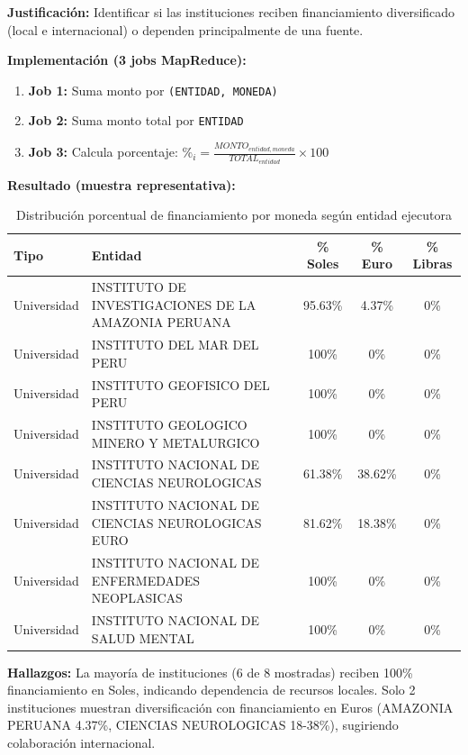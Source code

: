 \documentclass[12pt,a4paper]{article}
\begin{document}
\textbf{Justificación:} Identificar si las instituciones reciben financiamiento diversificado 
(local e internacional) o dependen principalmente de una fuente.

\textbf{Implementación (3 jobs MapReduce):}

\begin{enumerate}
    \item \textbf{Job 1:} Suma monto por \texttt{(ENTIDAD, MONEDA)}
    \item \textbf{Job 2:} Suma monto total por \texttt{ENTIDAD}
    \item \textbf{Job 3:} Calcula porcentaje: $\%_{i} = \frac{MONTO_{entidad,moneda}}{TOTAL_{entidad}} \times 100$
\end{enumerate}

\textbf{Resultado (muestra representativa):}

\begin{table}[H]
\centering
\small
\begin{tabular}{lp{5.5cm}ccc}
\toprule
\textbf{Tipo} & \textbf{Entidad} & \textbf{\% Soles} & \textbf{\% Euro} & \textbf{\% Libras} \\
\midrule
Universidad & INSTITUTO DE INVESTIGACIONES DE LA AMAZONIA PERUANA & 95.63\% & 4.37\% & 0\% \\
Universidad & INSTITUTO DEL MAR DEL PERU & 100\% & 0\% & 0\% \\
Universidad & INSTITUTO GEOFISICO DEL PERU & 100\% & 0\% & 0\% \\
Universidad & INSTITUTO GEOLOGICO MINERO Y METALURGICO & 100\% & 0\% & 0\% \\
Universidad & INSTITUTO NACIONAL DE CIENCIAS NEUROLOGICAS & 61.38\% & 38.62\% & 0\% \\
Universidad & INSTITUTO NACIONAL DE CIENCIAS NEUROLOGICAS EURO & 81.62\% & 18.38\% & 0\% \\
Universidad & INSTITUTO NACIONAL DE ENFERMEDADES NEOPLASICAS & 100\% & 0\% & 0\% \\
Universidad & INSTITUTO NACIONAL DE SALUD MENTAL & 100\% & 0\% & 0\% \\
\bottomrule
\end{tabular}
\caption{Distribución porcentual de financiamiento por moneda según entidad ejecutora}
\label{tab:porcentaje_moneda}
\end{table}

\textbf{Hallazgos:} La mayoría de instituciones (6 de 8 mostradas) reciben 100\% financiamiento en Soles, indicando dependencia de recursos locales. Solo 2 instituciones muestran diversificación con financiamiento en Euros (AMAZONIA PERUANA 4.37\%, CIENCIAS NEUROLOGICAS 18-38\%), sugiriendo colaboración internacional.
\end{document}
